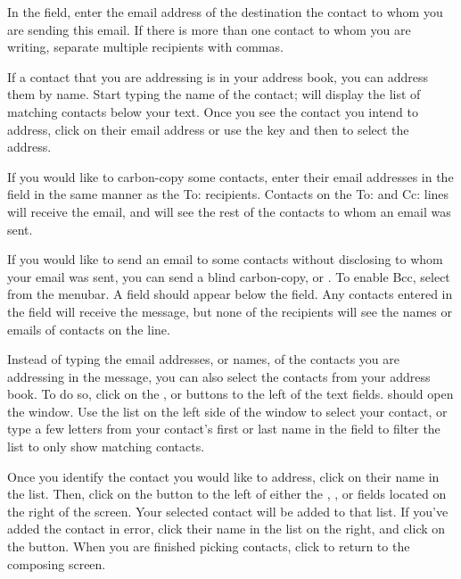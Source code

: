 In the  field, enter the email address of the destination \dash
the contact to whom you are sending this email. If there is more than one
contact to whom you are writing, separate multiple recipients with commas.

If a contact that you are addressing is in your address book, you can address
them by name. Start typing the name of the contact;  will display 
the list of matching contacts below your text. Once you see the contact 
you intend to address, click on their email address or use the 
 key and then  to select the address.

If you would like to carbon-copy some contacts, enter their email addresses in 
the  field in the same manner as the To: recipients. Contacts
on the To: and Cc: lines will receive the email, and will see the rest of the
contacts to whom an email was sent.


If you would like to send an email to some contacts without disclosing to whom
your email was sent, you can send a blind carbon-copy, or . To 
enable Bcc, select  from the menubar. A 
 field should appear below the  field. Any 
contacts entered in the  field will receive the message, but none of the recipients will see the names or emails of contacts on the  line. 

Instead of typing the email addresses, or names, of the contacts you are 
addressing in the message, you can also select the contacts from your address
book. To do so, click on the ,  or  buttons
to the left of the text fields.  should open the
 window. Use the list on the left
side of the window to select your contact, or type a few letters from your 
contact's first or last name in the  field to filter the 
list to only show matching contacts.

Once you identify the contact you would like to address, click on their name in
the list. Then, click on the  button to the left of either the 
, , or  fields located on the right of the screen. Your selected contact will be added to that list. If you've added the contact in error, click their name in the list on the right, and click on the 
 button. When you are finished picking contacts, click 
 to return to the composing screen.

